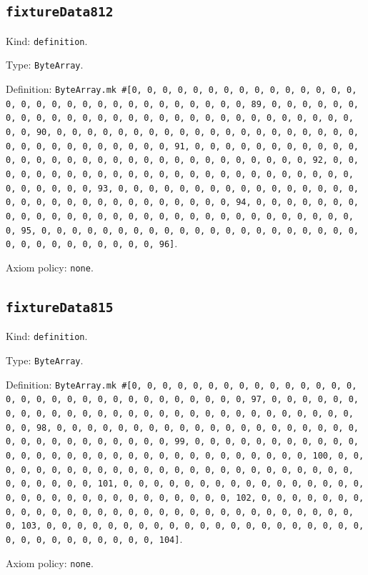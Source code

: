 \documentclass[11pt]{article}
\begin{document}
\subsection*{\texttt{fixtureData812}}
\noindent Kind: \texttt{definition}.\par
\noindent Type: \texttt{ByteArray}.\par
\noindent Definition: \texttt{ByteArray.mk \#[0, 0, 0, 0, 0, 0, 0, 0, 0, 0, 0, 0, 0, 0, 0, 0, 0, 0, 0, 0, 0, 0, 0, 0, 0, 0, 0, 0, 0, 0, 0, 89, 0, 0, 0, 0, 0, 0, 0, 0, 0, 0, 0, 0, 0, 0, 0, 0, 0, 0, 0, 0, 0, 0, 0, 0, 0, 0, 0, 0, 0, 0, 0, 90, 0, 0, 0, 0, 0, 0, 0, 0, 0, 0, 0, 0, 0, 0, 0, 0, 0, 0, 0, 0, 0, 0, 0, 0, 0, 0, 0, 0, 0, 0, 0, 91, 0, 0, 0, 0, 0, 0, 0, 0, 0, 0, 0, 0, 0, 0, 0, 0, 0, 0, 0, 0, 0, 0, 0, 0, 0, 0, 0, 0, 0, 0, 0, 92, 0, 0, 0, 0, 0, 0, 0, 0, 0, 0, 0, 0, 0, 0, 0, 0, 0, 0, 0, 0, 0, 0, 0, 0, 0, 0, 0, 0, 0, 0, 0, 93, 0, 0, 0, 0, 0, 0, 0, 0, 0, 0, 0, 0, 0, 0, 0, 0, 0, 0, 0, 0, 0, 0, 0, 0, 0, 0, 0, 0, 0, 0, 0, 94, 0, 0, 0, 0, 0, 0, 0, 0, 0, 0, 0, 0, 0, 0, 0, 0, 0, 0, 0, 0, 0, 0, 0, 0, 0, 0, 0, 0, 0, 0, 0, 95, 0, 0, 0, 0, 0, 0, 0, 0, 0, 0, 0, 0, 0, 0, 0, 0, 0, 0, 0, 0, 0, 0, 0, 0, 0, 0, 0, 0, 0, 0, 0, 96]}.\par
\noindent Axiom policy: \texttt{none}.\par
\subsection*{\texttt{fixtureData815}}
\noindent Kind: \texttt{definition}.\par
\noindent Type: \texttt{ByteArray}.\par
\noindent Definition: \texttt{ByteArray.mk \#[0, 0, 0, 0, 0, 0, 0, 0, 0, 0, 0, 0, 0, 0, 0, 0, 0, 0, 0, 0, 0, 0, 0, 0, 0, 0, 0, 0, 0, 0, 0, 97, 0, 0, 0, 0, 0, 0, 0, 0, 0, 0, 0, 0, 0, 0, 0, 0, 0, 0, 0, 0, 0, 0, 0, 0, 0, 0, 0, 0, 0, 0, 0, 98, 0, 0, 0, 0, 0, 0, 0, 0, 0, 0, 0, 0, 0, 0, 0, 0, 0, 0, 0, 0, 0, 0, 0, 0, 0, 0, 0, 0, 0, 0, 0, 99, 0, 0, 0, 0, 0, 0, 0, 0, 0, 0, 0, 0, 0, 0, 0, 0, 0, 0, 0, 0, 0, 0, 0, 0, 0, 0, 0, 0, 0, 0, 0, 100, 0, 0, 0, 0, 0, 0, 0, 0, 0, 0, 0, 0, 0, 0, 0, 0, 0, 0, 0, 0, 0, 0, 0, 0, 0, 0, 0, 0, 0, 0, 0, 101, 0, 0, 0, 0, 0, 0, 0, 0, 0, 0, 0, 0, 0, 0, 0, 0, 0, 0, 0, 0, 0, 0, 0, 0, 0, 0, 0, 0, 0, 0, 0, 102, 0, 0, 0, 0, 0, 0, 0, 0, 0, 0, 0, 0, 0, 0, 0, 0, 0, 0, 0, 0, 0, 0, 0, 0, 0, 0, 0, 0, 0, 0, 0, 103, 0, 0, 0, 0, 0, 0, 0, 0, 0, 0, 0, 0, 0, 0, 0, 0, 0, 0, 0, 0, 0, 0, 0, 0, 0, 0, 0, 0, 0, 0, 0, 104]}.\par
\noindent Axiom policy: \texttt{none}.\par
\end{document}

